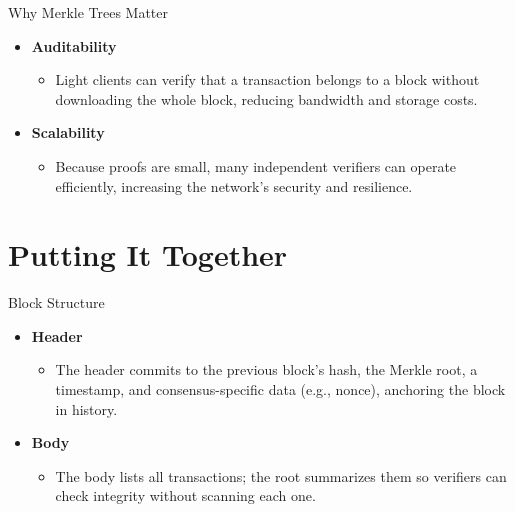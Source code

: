 \documentclass[aspectratio=169]{beamer}
\begin{document}
\begin{frame}{Why Merkle Trees Matter}
  \begin{itemize}
    \item \textbf{Auditability}
      \begin{itemize}
        \item Light clients can verify that a transaction belongs to a block without downloading the whole block, reducing bandwidth and storage costs.
      \end{itemize}
    \item \textbf{Scalability}
      \begin{itemize}
        \item Because proofs are small, many independent verifiers can operate efficiently, increasing the network’s security and resilience.
      \end{itemize}
  \end{itemize}
\end{frame}

\section{Putting It Together}

\begin{frame}{Block Structure}
  \begin{itemize}
    \item \textbf{Header}
      \begin{itemize}
        \item The header commits to the previous block’s hash, the Merkle root, a timestamp, and consensus-specific data (e.g., nonce), anchoring the block in history.
      \end{itemize}
    \item \textbf{Body}
      \begin{itemize}
        \item The body lists all transactions; the root summarizes them so verifiers can check integrity without scanning each one.
      \end{itemize}
  \end{itemize}
\end{frame}
\end{document}
